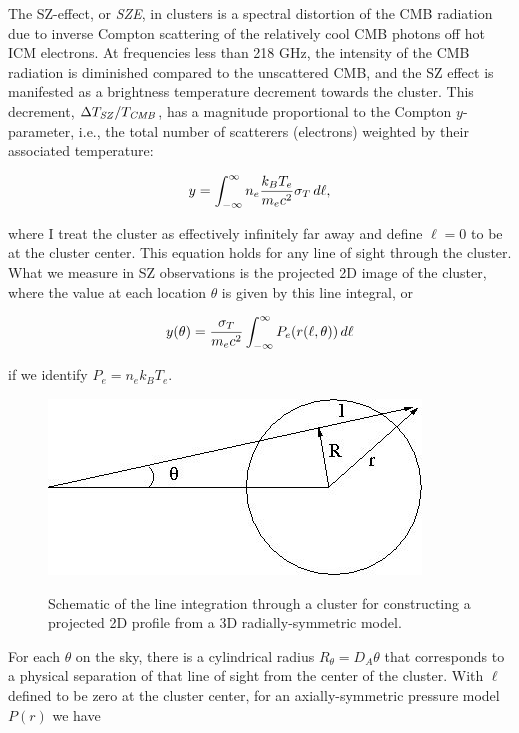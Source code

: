 The SZ-effect, or {\it SZE}, in clusters is a spectral distortion of
the CMB radiation due to inverse Compton scattering of the relatively
cool CMB photons off hot ICM electrons.  At frequencies less than 218
GHz, the intensity of the CMB radiation is diminished compared to the
unscattered CMB, and the SZ effect is manifested as a brightness
temperature decrement towards the cluster. This decrement, $\Delta
T_{\it SZ}/T_{\it CMB}$, has a magnitude proportional to the Compton
$y$-parameter, i.e., the total number of scatterers (electrons)
weighted by their associated temperature:

\begin{equation}
y = \int^{\infty}_{-\infty}{n_e {{k_B T_e}\over{m_e c^2}}\sigma_T\,d\ell},
\end{equation}

where I treat the cluster as effectively infinitely far away and
define $\ell = 0$ to be at the cluster center.  This equation holds
for any line of sight through the cluster.  What we measure in SZ
observations is the projected 2D image of the cluster, where the value
at each location $\theta$ is given by this line integral, or

\begin{equation}
y(\theta) = {{\sigma_T}\over{m_e c^2}}\int^{\infty}_{-\infty}{P_e(r(\ell,\theta))\,d\ell}
\end{equation}

if we identify $P_e = n_e k_B T_e$.

\begin{figure}[th]
\begin{center}
\includegraphics[scale=0.5]{figures/szmodel.jpg}\\
\end{center}
\caption{Schematic of the line integration through a cluster for
  constructing a projected 2D profile from a 3D radially-symmetric model.}
\end{figure}

For each $\theta$ on the sky, there is a cylindrical radius $R_\theta
= D_A\theta$ that corresponds to a physical separation of that line of
sight from the center of the cluster. With $\ell$ defined to be zero
at the cluster center, for an axially-symmetric pressure model
$P(r)$ we have


